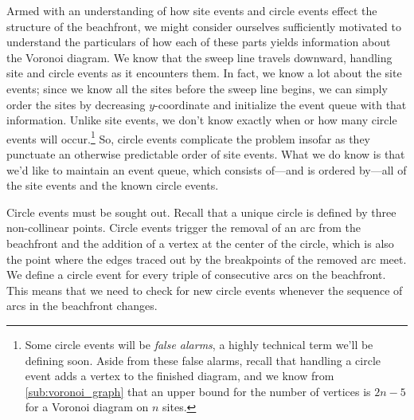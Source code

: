 \documentclass[12pt,twoside]{reedthesis}
\begin{document}
      Armed with an understanding of how site events and circle events effect the structure of the beachfront, we might consider ourselves sufficiently motivated to understand the particulars of how each of these parts yields information about the Voronoi diagram. We know that the sweep line travels downward, handling site and circle events as it encounters them. In fact, we know a lot about the site events; since we know all the sites before the sweep line begins, we can simply order the sites by decreasing $y$-coordinate and initialize the event queue with that information. Unlike site events, we don't know exactly when or how many circle events will occur.\footnote{Some circle events will be \emph{false alarms}, a highly technical term we'll be defining soon. Aside from these false alarms, recall that handling a circle event adds a vertex to the finished diagram, and we know from \cref{sub:voronoi_graph} that an upper bound for the number of vertices is $2n-5$ for a Voronoi diagram on $n$ sites.} So, circle events complicate the problem insofar as they punctuate an otherwise predictable order of site events. What we do know is that we'd like to maintain an event queue, which consists of---and is ordered by---all of the site events and the known circle events. \par

      Circle events must be sought out. Recall that a unique circle is defined by three non-collinear points. Circle events trigger the removal of an arc from the beachfront and the addition of a vertex at the center of the circle, which is also the point where the edges traced out by the breakpoints of the removed arc meet. We define a circle event for every triple of consecutive arcs on the beachfront. This means that we need to check for new circle events whenever the sequence of arcs in the beachfront changes.\par
\end{document}
